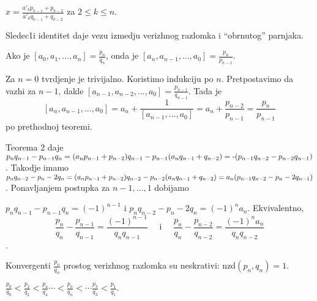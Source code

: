 \documentclass[11pt]{article}
\newcommand{\D}{\displaystyle}
\begin{document}
\begin{pos}
    $x=\D\frac{a'_kp_{k-1}+p_{k-2}}{a'_kq_{k-1}+q_{k-2}}$ za $2\leq k\leq n$.
\end{pos}
Sledec1i identitet daje vezu izmedju verizhnog razlomka i “obrnutog” parnjaka.
\begin{te}
Ako je $[a_0,a_1,...,a_n] =\frac{p_n}{q_n}$, onda je $[a_n,a_{n-1},...,a_0]=\frac{p_n}{p_{n-1}}$.
\end{te}
\begin{dok}
Za $n=0$ tvrdjenje je trivijalno. Koristimo indukciju po $n$. Pretpostavimo da vazhi za  $n-1$, dakle $[a_{n-1},a_{n-2},...,a_0]=\frac{p_{n-1}}{q_{n-1}}$. Tada je $$[a_n,a_{n-1},...,a_0]=a_n+\frac{1}{[a_{n-1},...,a_0]}=a_n+\frac{p_{n-2}}{p_{n-1}}=\frac{p_n}{p_{n-1}}$$
po prethodnoj teoremi.
\end{dok}
\newpage
Teorema 2 daje $p_nq_{n-1}-p_{n-1}q_n=(a_np_{n-1}+p_{n-2})q_{n-1}-p_{n-1}(a_nq_{n-1}+q_{n-2})=\text -(p_{n-1}q_{n-2}-p_{n-2}q_{n-1})$. Takodje imamo $p_nq_{n-2}-p_n-2q_n = (a_np_{n-1}+p_{n-2})q_{n-2}-p_{n-2}(a_nq_{n-1}+q_{n-2})=\\ a_n(p_{n-1}q_{n-2}-p_n-2q_{n-1})$.  Ponavljanjem postupka za $n-1,...,1$ dobijamo
\begin{te}
$p_nq_{n-1}-p_{n-1}q_n=(-1)^{n-1}$ i $p_nq_{n-2}-p_n-2q_n=(-1)^na_n$. Ekvivalentno, $$\frac{p_n}{q_n}-\frac{p_{n-1}}{q_{n-1}}=\frac{(-1)^{n-1}}{q_nq_{n-1}}\quad\text{ i }\quad\frac{p_n}{q_n}-\frac{p_{n-2}}{q_{n-2}}=\frac{(-1)^{n}a_n}{q_nq_{n-2}}$$.
\end{te}
\begin{pos}
Konvergenti $\frac{p_n}{q_n}$ prostog verizhnog razlomka su neskrativi: nzd$(p_n,q_n)=1$.
\end{pos}
\begin{pos}
$\D\frac{p_0}{q_0}<\frac{p_2}{q_2}<\frac{p_4}{q_4}\cdots<\frac{p_n}{q_n}<\cdots\frac{p_3}{q_3}<\frac{p_1}{q_1}.$
\end{pos}
\end{document}
